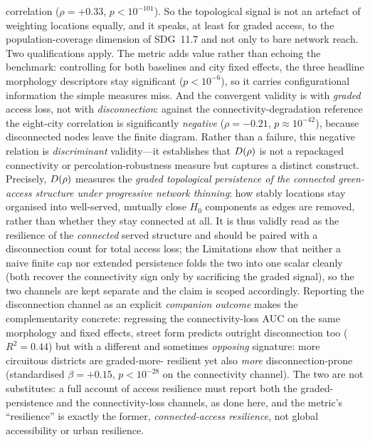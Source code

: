 correlation ($\rho=+0.33$, $p<10^{-101}$). So the topological signal is not an artefact of weighting locations
equally, and it speaks, at least for graded access, to the population-coverage
dimension of SDG~11.7 and not only to bare network reach. Two qualifications
apply. The metric adds value rather than echoing the benchmark: controlling for
both baselines and city fixed effects, the three headline morphology descriptors
stay significant ($p<10^{-6}$), so it carries configurational information the simple
measures miss. And the convergent validity is with \emph{graded} access loss, not
with \emph{disconnection}: against the connectivity-degradation reference the
eight-city correlation is significantly \emph{negative} ($\rho=-0.21$,
$p\approx10^{-42}$), because disconnected nodes leave the finite diagram. Rather than
a failure, this negative relation is \emph{discriminant} validity---it establishes
that $D(\rho)$ is not a repackaged connectivity or percolation-robustness measure but
captures a distinct construct. Precisely, $D(\rho)$ measures the
\emph{graded topological persistence of the connected green-access structure under
progressive network thinning}: how stably locations stay organised into well-served,
mutually close $H_0$ components as edges are removed, rather than whether they stay
connected at all. It is thus validly read as the resilience of the \emph{connected}
served structure and should be paired with a disconnection count for total access
loss; the Limitations show that neither a naive finite cap nor extended persistence
folds the two into one scalar cleanly (both recover the connectivity sign only by
sacrificing the graded signal), so the two channels are kept separate and the claim
is scoped accordingly. Reporting the disconnection channel as an explicit
\emph{companion outcome} makes the complementarity concrete: regressing the
connectivity-loss AUC on the same morphology and fixed effects, street form predicts
outright disconnection too ($R^2=0.44$) but with a different and sometimes
\emph{opposing} signature: more circuitous districts are graded-more-
resilient yet also \emph{more} disconnection-prone (standardised $\beta=+0.15$,
$p<10^{-28}$ on the connectivity channel). The two are not substitutes: a full account
of access resilience must report both the graded-persistence and the connectivity-loss
channels, as done here, and the metric's ``resilience'' is exactly the former,
\emph{connected-access resilience}, not global accessibility or urban resilience.

